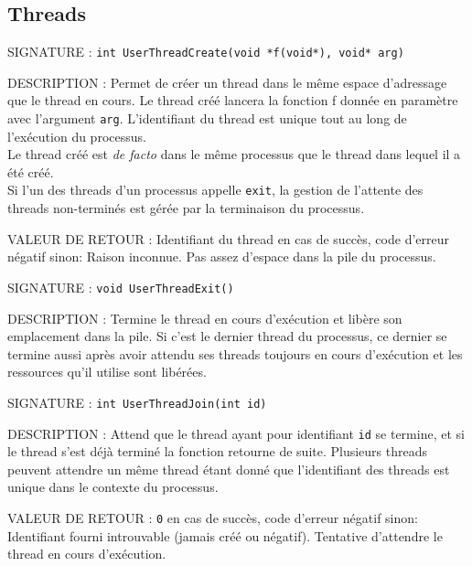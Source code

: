\documentclass{article}
\begin{document}
	\subsection{Threads}
		\begin{description}
			\item{SIGNATURE : } \texttt{int UserThreadCreate(void *f(void*), void* arg)}
			\item{DESCRIPTION : } Permet de créer un thread dans le même espace d'adressage que le thread en cours. Le thread créé lancera la fonction f donnée en paramètre avec l'argument \texttt{arg}. L'identifiant du thread est unique tout au long de l'exécution du processus. \\
			Le thread créé est \emph{de facto} dans le même processus que le thread dans lequel il a été créé. \\
			Si l'un des threads d'un processus appelle \texttt{exit}, la gestion de l'attente des threads non-terminés est gérée par la terminaison du processus.
			\item{VALEUR DE RETOUR : } Identifiant du thread en cas de succès, code d'erreur négatif sinon:
				 Raison inconnue.
				 Pas assez d'espace dans la pile du processus.
		\end{description}
		\vspace{2.5mm}
		\begin{description}
			\item{SIGNATURE : } \texttt{void UserThreadExit()}
			\item{DESCRIPTION : } Termine le thread en cours d’exécution et libère son emplacement dans la pile. Si c'est le dernier thread du processus, ce dernier se termine aussi après avoir attendu ses threads toujours en cours d'exécution et les ressources qu'il utilise sont libérées.
		\end{description}
		\vspace{2.5mm}
		\begin{description}
			\item{SIGNATURE : } \texttt{int UserThreadJoin(int id)}
			\item{DESCRIPTION : } Attend que le thread ayant pour identifiant \texttt{id} se termine, et si le thread s'est déjà terminé la fonction retourne de suite. Plusieurs threads peuvent attendre un même thread étant donné que l'identifiant des threads est unique dans le contexte du processus.
			\item{VALEUR DE RETOUR : } \texttt{0} en cas de succès, code d'erreur négatif sinon:
				 Identifiant fourni introuvable (jamais créé ou négatif).
				 Tentative d'attendre le thread en cours d'exécution.
		\end{description}
\end{document}
